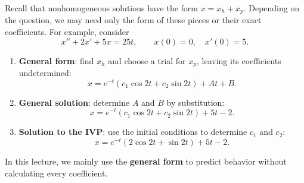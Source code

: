 \documentclass[10pt,letterpaper]{article}
\begin{document}
Recall that nonhomogeneous solutions have the form $x=x_h+x_p$. Depending on the question,
we may need only the form of these pieces or their exact
coefficients. For example, consider
\[
x''+2x'+5x=25t,\qquad x(0)=0,\quad x'(0)=5.
\]
\begin{enumerate}
    \item \textbf{General form}: find $x_h$ and choose a trial
    for $x_p$, leaving its coefficients undetermined:
    \[
    x=e^{-t}(c_1\cos2t+c_2\sin2t)+At+B.
    \]

    \item \textbf{General solution}: determine $A$ and $B$
    by substitution:
    \[
    x=e^{-t}(c_1\cos2t+c_2\sin2t)+5t-2.
    \]

    \item \textbf{Solution to the IVP}: use the initial
    conditions to determine $c_1$ and $c_2$:
    \[
    x=e^{-t}(2\cos2t+\sin2t)+5t-2.
    \]
\end{enumerate}
In this lecture, we mainly use the \textbf{general form}
to predict behavior without calculating every coefficient.
\end{document}
